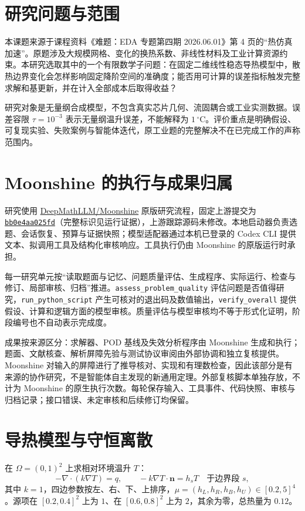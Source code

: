\section{研究问题与范围}
本课题来源于课程资料《难题：EDA 专题第四期 2026.06.01》第 4 页的“热仿真加速”。原题涉及大规模网格、变化的换热系数、非线性材料及工业计算资源约束。本研究选取其中的一个有限数学子问题：在固定二维线性稳态导热模型中，散热边界变化会怎样影响固定降阶空间的准确度；能否用可计算的误差指标触发完整求解和基更新，并在计入全部成本后取得收益？

研究对象是无量纲合成模型，不包含真实芯片几何、流固耦合或工业实测数据。误差容限 $\tau=10^{-3}$ 表示无量纲温升误差，不能解释为 $1\,{}^{\circ}\mathrm{C}$。评价重点是明确假设、可复现实验、失败案例与智能体迭代，原工业题的完整解决不在已完成工作的声称范围内。

\section{Moonshine 的执行与成果归属}
研究使用 \href{https://github.com/DeepMathLLM/Moonshine}{DeepMathLLM/Moonshine} 原版研究流程，固定上游提交为
\href{https://github.com/DeepMathLLM/Moonshine/tree/bb0e4aa025fdcc5297fff1025ab4876f120ed615}{\texttt{bb0e4aa025fd}}（完整标识见运行证据），上游跟踪源码未修改。本地启动器负责选题、会话恢复、预算与证据快照；模型适配器通过本机已登录的 Codex CLI 提供文本、拟调用工具及结构化审核响应。工具执行仍由 Moonshine 的原版运行时承担。

每一研究单元按“读取题面与记忆、问题质量评估、生成程序、实际运行、检查与修订、局部审核、归档”推进。\texttt{assess\_problem\_quality} 评估问题是否值得研究，\texttt{run\_python\_script} 产生可核对的退出码及数值输出，\texttt{verify\_overall} 提供假设、计算和逻辑方面的模型审核。质量评估与模型审核均不等于形式化证明，阶段编号也不自动表示完成度。

成果按来源区分：求解器、POD 基线及失效分析程序由 Moonshine 生成和执行；题面、文献核查、解析屏障先验与测试协议审阅由外部协调和独立复核提供。Moonshine 对输入的屏障进行了推导核对、实现和有理数检查，因此该部分是有来源的协作研究，不是智能体自主发现的新通用定理。外部复核脚本单独存放，不计为 Moonshine 的原生执行次数。每轮保存输入、工具事件、代码快照、审核与归档记录；接口错误、未定审核和后续修订均保留。

\section{导热模型与守恒离散}
在 $\Omega=(0,1)^2$ 上求相对环境温升 $T$：
\begin{equation}
 -\nabla\!\cdot(k\nabla T)=q,\qquad
 -k\nabla T\cdot\boldsymbol n=h_sT\quad\text{于边界段 }s,
 \label{eq:thermal-pde}
\end{equation}
其中 $k=1$，四边参数按左、右、下、上排序，$\mu=(h_L,h_R,h_B,h_U)\in[0.2,5]^4$。源项在 $[0.2,0.4]^2$ 上为 $1$、在 $[0.6,0.8]^2$ 上为 $2$，其余为零，总热量为 $0.12$。

